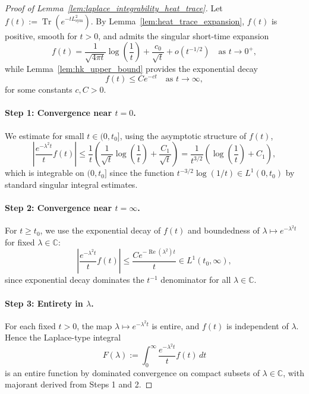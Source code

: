 \begin{proof}[Proof of Lemma~\ref{lem:laplace_integrability_heat_trace}]
Let \( f(t) := \operatorname{Tr}\left(e^{-t L_{\mathrm{sym}}^2}\right) \). By Lemma~\ref{lem:heat_trace_expansion}, \( f(t) \) is positive, smooth for \( t > 0 \), and admits the singular short-time expansion
\[
f(t) = \frac{1}{\sqrt{4\pi t}} \log\left( \frac{1}{t} \right) + \frac{c_0}{\sqrt{t}} + o(t^{-1/2}) \quad \text{as } t \to 0^+,
\]
while Lemma~\ref{lem:hk_upper_bound} provides the exponential decay
\[
f(t) \leq C e^{-c t} \quad \text{as } t \to \infty,
\]
for some constants \( c, C > 0 \).

\paragraph{Step 1: Convergence near \( t = 0 \).}
We estimate for small \( t \in (0, t_0] \), using the asymptotic structure of \( f(t) \),
\[
\left| \frac{e^{-\lambda^2 t}}{t} f(t) \right|
\leq \frac{1}{t} \left( \frac{1}{\sqrt{t}} \log\left( \frac{1}{t} \right) + \frac{C_1}{\sqrt{t}} \right)
= \frac{1}{t^{3/2}} \left( \log\left( \frac{1}{t} \right) + C_1 \right),
\]
which is integrable on \( (0, t_0] \) since the function \( t^{-3/2} \log(1/t) \in L^1(0, t_0) \) by standard singular integral estimates.

\paragraph{Step 2: Convergence near \( t = \infty \).}
For \( t \geq t_0 \), we use the exponential decay of \( f(t) \) and boundedness of \( \lambda \mapsto e^{-\lambda^2 t} \) for fixed \( \lambda \in \mathbb{C} \):
\[
\left| \frac{e^{-\lambda^2 t}}{t} f(t) \right| \leq \frac{C e^{-\operatorname{Re}(\lambda^2) t}}{t} \in L^1(t_0, \infty),
\]
since exponential decay dominates the \( t^{-1} \) denominator for all \( \lambda \in \mathbb{C} \).

\paragraph{Step 3: Entirety in \( \lambda \).}
For each fixed \( t > 0 \), the map \( \lambda \mapsto e^{-\lambda^2 t} \) is entire, and \( f(t) \) is independent of \( \lambda \). Hence the Laplace-type integral
\[
F(\lambda) := \int_0^\infty \frac{e^{-\lambda^2 t}}{t} f(t)\, dt
\]
is an entire function by dominated convergence on compact subsets of \( \lambda \in \mathbb{C} \), with majorant derived from Steps 1 and 2.


\end{proof}
